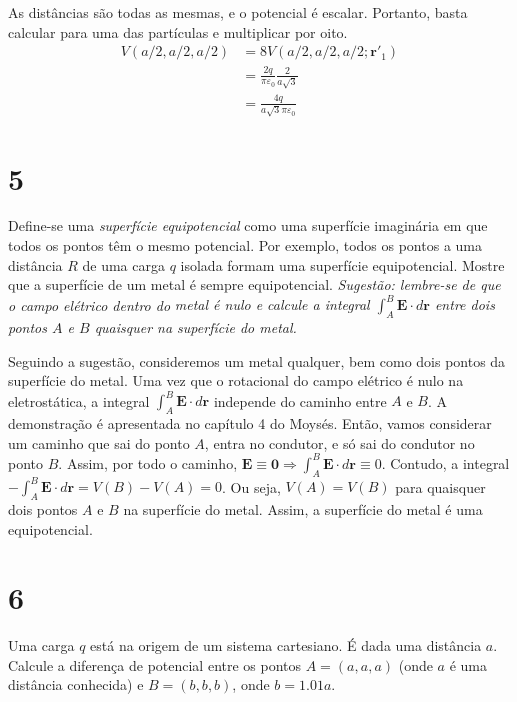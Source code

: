 \documentclass[11pt]{article}
\begin{document}
As distâncias são todas as mesmas, e o potencial é escalar. Portanto,
basta calcular para uma das partículas e multiplicar por oito.
\begin{align}
  V(a/2,a/2,a/2) &= 8V(a/2,a/2,a/2;\mathbf r'_1)\\
                 &= \frac{2q}{\pi\varepsilon_0}\frac 2{a\sqrt3}\\
                 &= \frac{4q}{a\sqrt3\pi\varepsilon_0}
\end{align}

\section{5}
\label{sec:org410550b}
Define-se uma \emph{superfície equipotencial} como uma superfície imaginária
em que todos os pontos têm o mesmo potencial. Por exemplo, todos os
pontos a uma distância \(R\) de uma carga \(q\) isolada formam uma
superfície equipotencial. Mostre que a superfície de um metal é sempre
equipotencial. \emph{Sugestão: lembre-se de que o campo elétrico dentro do}
\emph{metal é nulo e calcule a integral \(\int_A^B \mathbf E\cdot d\mathbf r\) entre dois}
\emph{pontos \(A\) e \(B\) quaisquer na superfície do metal.}

Seguindo a sugestão, consideremos um metal qualquer, bem como dois
pontos da superfície do metal. Uma vez que o rotacional do campo
elétrico é nulo na eletrostática, a integral \(\int_A^B \mathbf E\cdot d\mathbf
r\) independe do caminho entre \(A\) e \(B\). A demonstração é apresentada no
capítulo 4 do Moysés. Então, vamos considerar um caminho que sai do
ponto \(A\), entra no condutor, e só sai do condutor no ponto \(B\). Assim,
por todo o caminho, \(\mathbf E\equiv\mathbf0 \Rightarrow \int_A^B \mathbf E\cdot d\mathbf
r \equiv 0\). Contudo, a integral \(-\int_A^B \mathbf E\cdot d\mathbf r = V(B) - V(A) =
0\). Ou seja, \(V(A) = V(B)\) para quaisquer dois pontos \(A\) e \(B\) na
superfície do metal. Assim, a superfície do metal é uma equipotencial.
\section{6}
\label{sec:orgd31f9ec}
Uma carga \(q\) está na origem de um sistema cartesiano. É dada uma
distância \(a\). Calcule a diferença de potencial entre os pontos \(A =
(a,a,a)\) (onde \(a\) é uma distância conhecida) e \(B=(b,b,b)\), onde
\(b=1.01a\).
\end{document}
